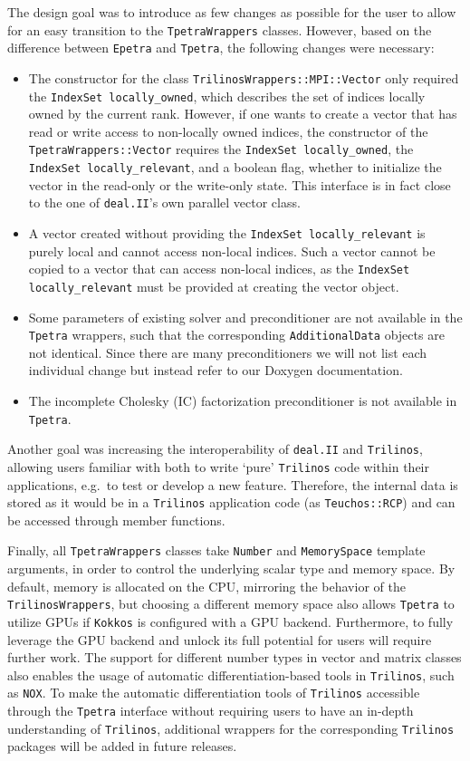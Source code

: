 \documentclass{ansarticle-preprint}
\newcommand{\specialword}[1]{\texttt{#1}}
\newcommand{\dealii}{{\specialword{deal.II}}\xspace}
\newcommand{\trilinos}{{\specialword{Trilinos}}\xspace}
\newcommand{\kokkos}{{\specialword{Kokkos}}\xspace}
\newcommand{\epetra}{{\specialword{Epetra}}\xspace}
\newcommand{\tpetra}{{\specialword{Tpetra}}\xspace}
\begin{document}
The design goal was to introduce as few changes as possible for the user to allow for an easy transition to the
\texttt{TpetraWrappers} classes.
However, based on the difference between \epetra{} and \tpetra{}, the following changes were necessary:
\begin{itemize}
  \item The constructor for the class \texttt{TrilinosWrappers::MPI::Vector} only required the \texttt{IndexSet locally\_owned},
    which describes the set of indices locally owned by the current rank.
    However, if one wants to create a vector that has read or write access to non-locally owned indices,  the constructor of the
    \texttt{TpetraWrappers::Vector} requires the \texttt{IndexSet locally\_owned}, the \texttt{IndexSet locally\_relevant}, and
    a boolean flag, whether to initialize the vector in the read-only or the write-only state.
    This interface is in fact close to the one of \dealii{}'s own parallel vector class.
  \item A vector created without providing the \texttt{IndexSet locally\_relevant} is purely local and cannot access non-local indices.
    Such a vector cannot be copied to a vector that can access non-local indices, as the \texttt{IndexSet locally\_relevant} must
    be provided at creating the vector object. 
  \item Some parameters of existing solver and preconditioner are
    not available in the \tpetra{} wrappers,
    such that the corresponding \texttt{AdditionalData} objects are not identical. 
    Since there are many preconditioners we will not list each individual change but instead refer 
    to our Doxygen documentation. 
  \item The incomplete Cholesky (IC) factorization preconditioner is not available 
   in \tpetra{}.
\end{itemize}

Another goal was increasing the interoperability of \dealii{} and \trilinos{},
allowing users familiar with both to write `pure' \trilinos{} code within their 
applications, e.g.\ to test or develop a new feature.
Therefore, the internal data is stored as it would be in a \trilinos{} 
application code (as \texttt{Teuchos::RCP}) and can be accessed through member functions. 

Finally,
all \texttt{TpetraWrappers} classes take \texttt{Number} and \texttt{MemorySpace} template arguments,
in order to control the underlying scalar type and memory space.
By default, memory is allocated on the CPU, mirroring the behavior of
the \texttt{TrilinosWrappers}, but choosing a different memory space
also allows \tpetra{} to utilize GPUs if \kokkos{} is configured
with a GPU backend.
Furthermore, to fully leverage the GPU backend and unlock its full potential for users will require further work.
The support for different number types in vector and matrix classes also enables the usage of automatic differentiation-based tools in
\trilinos{}, such as \texttt{NOX}.
To make the automatic differentiation tools of \trilinos{} accessible through the \tpetra{} interface without
requiring users to have an in-depth understanding of \trilinos{}, additional wrappers for the corresponding
\trilinos{} packages will be added in future releases.
\end{document}
